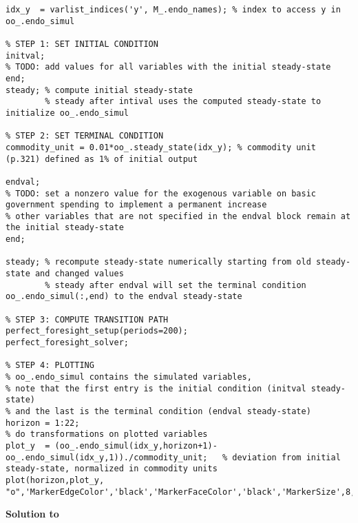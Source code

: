 {\footnotesize
\begin{lstlisting}[style=Matlab-editor,basicstyle=\mlttfamily\scriptsize]
idx_y  = varlist_indices('y', M_.endo_names); % index to access y in oo_.endo_simul

% STEP 1: SET INITIAL CONDITION
initval;
% TODO: add values for all variables with the initial steady-state
end;
steady; % compute initial steady-state
        % steady after intival uses the computed steady-state to initialize oo_.endo_simul

% STEP 2: SET TERMINAL CONDITION
commodity_unit = 0.01*oo_.steady_state(idx_y); % commodity unit (p.321) defined as 1% of initial output

endval;
% TODO: set a nonzero value for the exogenous variable on basic government spending to implement a permanent increase
% other variables that are not specified in the endval block remain at the initial steady-state
end;

steady; % recompute steady-state numerically starting from old steady-state and changed values
        % steady after endval will set the terminal condition oo_.endo_simul(:,end) to the endval steady-state

% STEP 3: COMPUTE TRANSITION PATH
perfect_foresight_setup(periods=200);
perfect_foresight_solver;

% STEP 4: PLOTTING
% oo_.endo_simul contains the simulated variables,
% note that the first entry is the initial condition (initval steady-state)
% and the last is the terminal condition (endval steady-state)
horizon = 1:22;
% do transformations on plotted variables
plot_y  = (oo_.endo_simul(idx_y,horizon+1)-oo_.endo_simul(idx_y,1))./commodity_unit;   % deviation from initial steady-state, normalized in commodity units
plot(horizon,plot_y, "o",'MarkerEdgeColor','black','MarkerFaceColor','black','MarkerSize',8,'LineStyle','none');

\end{lstlisting}
}%

\begin{solution}\textbf{Solution to }
\ifDisplaySolutions

\fi
\newpage
\end{solution}